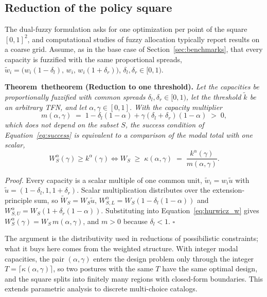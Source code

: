 \documentclass[Review,sagev,times]{sagej}%
\newcommand{\stmt}[3]{\refstepcounter{#1}\label{#2}#3~\csname the#1\endcsname}
\newcommand{\kag}{k^{\alpha}(\gamma)}\newcommand{\WS}{\tilde{W}_S}\newcommand{\Zsuf}{Z^{\mathrm{suf}}}
\begin{document}
\subsection{Reduction of the policy square} \label{sec:reduction}
The dual-fuzzy formulation asks for one optimization per point of the square $[0,1]^2$, and computational
studies of fuzzy allocation typically report results on a coarse grid. Assume, as in the base case of
Section~\ref{sec:benchmarks}, that every capacity is fuzzified with the same proportional spreads,
$\tilde{w}_i = \big(w_i(1-\delta_l),\, w_i,\, w_i(1+\delta_r)\big)$, $\delta_l,\delta_r\in[0,1)$.

\textbf{\stmt{theorem}{thm:reduction}{Theorem} (Reduction to one threshold).}
\textit{Let the capacities be proportionally fuzzified with common spreads $\delta_l,\delta_r \in [0,1)$,
let the threshold $\tilde{k}$ be an arbitrary TFN, and let $\alpha,\gamma \in [0,1]$. With the
capacity multiplier}
\begin{equation}
m(\alpha,\gamma) \;=\; 1 - \delta_l(1-\alpha) + \gamma(\delta_l+\delta_r)(1-\alpha) \;>\;0,
\label{eq:multiplier}
\end{equation}
\textit{which does not depend on the subset $S$, the success condition of Equation~\eqref{eq:success} is
equivalent to a comparison of the modal total with one scalar,}
\begin{equation}
W_S^{\alpha}(\gamma) \ge \kag
\iff
W_S \;\ge\; \kappa(\alpha,\gamma) \;=\; \frac{\kag}{m(\alpha,\gamma)} .
\label{eq:kappa}
\end{equation}

\textit{Proof.} Every capacity is a scalar multiple of one common unit, $\tilde{w}_i = w_i\tilde{u}$ with
$\tilde{u}=(1-\delta_l,1,1+\delta_r)$. Scalar multiplication distributes over the extension-principle
sum\cite{DuboisPrade1978}, so $\WS=W_S\tilde{u}$, $W_{S,L}^{\alpha}=W_S(1-\delta_l(1-\alpha))$ and
$W_{S,U}^{\alpha}=W_S(1+\delta_r(1-\alpha))$. Substituting into Equation~\eqref{eq:hurwicz_w} gives
$W_S^{\alpha}(\gamma)=W_S\,m(\alpha,\gamma)$, and $m>0$ because $\delta_l<1$. $\square$

The argument is the distributivity used in reductions of possibilistic constraints\cite{InuiguchiRamik2000,Rommelfanger1996,CadenasVerdegay1997};
what it buys here comes from the weighted structure. With integer modal capacities, the pair $(\alpha,\gamma)$
enters the design problem only through the integer $T=\lceil\kappa(\alpha,\gamma)\rceil$, so two postures with
the same $T$ have the same optimal design, and the square splits into finitely many regions with closed-form
boundaries. This extends parametric analysis\cite{CarlssonKorhonen1986} to discrete multi-choice catalogs.
\end{document}
